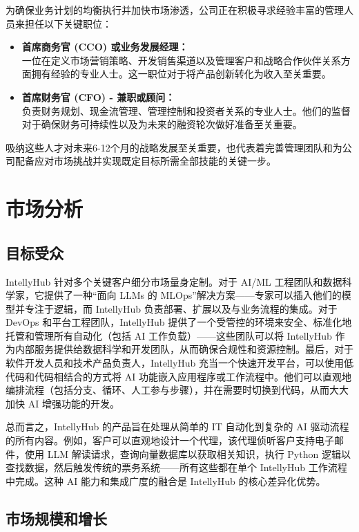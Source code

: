 \documentclass[11pt, a4paper, oneside]{article}
\begin{document}
为确保业务计划的均衡执行并加快市场渗透，公司正在积极寻求经验丰富的管理人员来担任以下关键职位：

\begin{itemize}
    \item \textbf{首席商务官 (CCO) 或业务发展经理：} \\
    一位在定义市场营销策略、开发销售渠道以及管理客户和战略合作伙伴关系方面拥有经验的专业人士。这一职位对于将产品创新转化为收入至关重要。

    \item \textbf{首席财务官 (CFO) - 兼职或顾问：} \\
    负责财务规划、现金流管理、管理控制和投资者关系的专业人士。他们的监督对于确保财务可持续性以及为未来的融资轮次做好准备至关重要。
\end{itemize}

吸纳这些人才对未来6-12个月的战略发展至关重要，也代表着完善管理团队和为公司配备应对市场挑战并实现既定目标所需全部技能的关键一步。


\section{市场分析}
\subsection{目标受众}

IntellyHub 针对多个关键客户细分市场量身定制。对于 AI/ML 工程团队和数据科学家，它提供了一种“面向 LLMs 的 MLOps”解决方案——专家可以插入他们的模型并专注于逻辑，而 IntellyHub 负责部署、扩展以及与业务流程的集成。对于 DevOps 和平台工程团队，IntellyHub 提供了一个受管控的环境来安全、标准化地托管和管理所有自动化（包括 AI 工作负载）——这些团队可以将 IntellyHub 作为内部服务提供给数据科学和开发团队，从而确保合规性和资源控制。最后，对于软件开发人员和技术产品负责人，IntellyHub 充当一个快速开发平台，可以使用低代码和代码相结合的方式将 AI 功能嵌入应用程序或工作流程中。他们可以直观地编排流程（包括分支、循环、人工参与步骤），并在需要时切换到代码，从而大大加快 AI 增强功能的开发。


总而言之，IntellyHub 的产品旨在处理从简单的 IT 自动化到复杂的 AI 驱动流程的所有内容。例如，客户可以直观地设计一个代理，该代理侦听客户支持电子邮件，使用 LLM 解读请求，查询向量数据库以获取相关知识，执行 Python 逻辑以查找数据，然后触发传统的票务系统——所有这些都在单个 IntellyHub 工作流程中完成。这种 AI 能力和集成广度的融合是 IntellyHub 的核心差异化优势。

\subsection{市场规模和增长}
\end{document}
